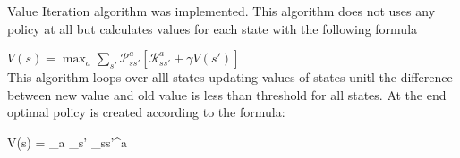 
Value Iteration algorithm was implemented. This algorithm does not uses any policy at all but calculates values for each state with the following formula

\begin{math}
  V(s) = \max_a \sum_{s'} \mathcal{P}_{ss'}^a \left[\mathcal{R}_{ss'}^a + \gamma V(s') \right]
\end{math} \\

This algorithm loops over alll states updating values of states unitl the difference between new value and old value is less than threshold for all states. At the end optimal policy is created according to the formula:

V(s) = \argmax_a \sum_{s'} _{ss'}^a 